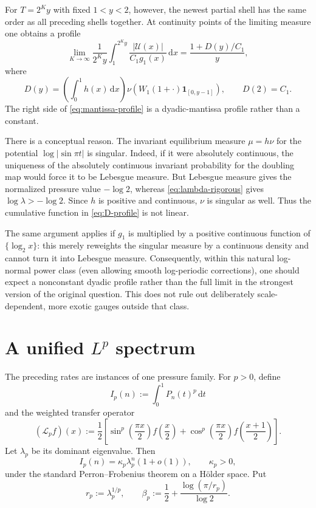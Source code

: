 \documentclass[11pt,oneside]{article}
\theoremstyle{definition}
\theoremstyle{remark}
\newcommand{\dd}{\,\mathrm d}
\newcommand{\Uhat}{\mathcal U}
\newcommand{\Lop}{\mathcal L}
\begin{document}
For $T=2^Ky$ with fixed $1<y<2$, however, the newest partial shell has the same order as
all preceding shells together.  At continuity points of the limiting measure one obtains
a profile
\begin{equation}\label{eq:mantissa-profile}
 \lim_{K\to\infty}
 \frac1{2^Ky}\int_{1}^{2^Ky}
 \frac{|\Uhat(x)|}{C_1g_1(x)}\dd x
 =\frac{1+D(y)/C_1}{y},
\end{equation}
where
\begin{equation}\label{eq:D-profile}
 D(y)=\left(\int_0^1h(x)\dd x\right)
 \nu\!\left(W_1(1+\cdot)\mathbf1_{[0,y-1]}\right),
 \qquad D(2)=C_1.
\end{equation}
The right side of \eqref{eq:mantissa-profile} is a dyadic-mantissa profile rather than a
constant.

There is a conceptual reason.  The invariant equilibrium measure $\mu=h\nu$ for the
potential $\log|\sin\pi t|$ is singular.  Indeed, if it were absolutely continuous, the
uniqueness of the absolutely continuous invariant probability for the doubling map would
force it to be Lebesgue measure.  But Lebesgue measure gives the normalized pressure
value $-\log2$, whereas \eqref{eq:lambda-rigorous} gives
$\log\lambda>-\log2$.  Since $h$ is positive and continuous, $\nu$ is singular as well.
Thus the cumulative function in \eqref{eq:D-profile} is not linear.

The same argument applies if $g_1$ is multiplied by a positive continuous function of
$\{\log_2x\}$: this merely reweights the singular measure by a continuous density and
cannot turn it into Lebesgue measure.  Consequently, within this natural log-normal
power class (even allowing smooth log-periodic corrections), one should expect a
nonconstant dyadic profile rather than the full limit in the strongest version of the
original question.  This does not rule out deliberately scale-dependent, more exotic
gauges outside that class.

\section{A unified \texorpdfstring{$L^p$}{Lp} spectrum}\label{sec:Lp}

The preceding rates are instances of one pressure family.  For $p>0$, define
\begin{equation}\label{eq:Ip}
 I_p(n):=\int_0^1P_n(t)^p\dd t
\end{equation}
and the weighted transfer operator
\begin{equation}\label{eq:Lp-op}
 (\Lop_p f)(x):=\frac12\left[
 \sin^p\!\left(\frac{\pi x}{2}\right)f\!\left(\frac x2\right)
 +\cos^p\!\left(\frac{\pi x}{2}\right)f\!\left(\frac{x+1}{2}\right)
 \right].
\end{equation}
Let $\lambda_p$ be its dominant eigenvalue.  Then
\begin{equation}\label{eq:Ip-asymp}
 I_p(n)=\kappa_p\lambda_p^n(1+o(1)),
 \qquad \kappa_p>0,
\end{equation}
under the standard Perron--Frobenius theorem on a H\"older space.  Put
\begin{equation}\label{eq:rp-betap}
 r_p:=\lambda_p^{1/p},
 \qquad
 \beta_p:=\frac12+\frac{\log(\pi/r_p)}{\log2}.
\end{equation}
\end{document}
